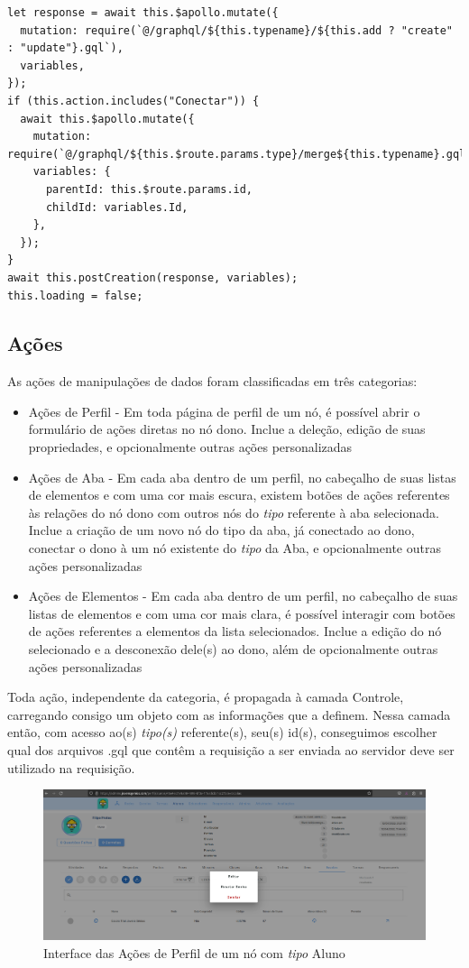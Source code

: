 \begin{lstlisting}
let response = await this.$apollo.mutate({
  mutation: require(`@/graphql/${this.typename}/${this.add ? "create" : "update"}.gql`),
  variables,
});
if (this.action.includes("Conectar")) {
  await this.$apollo.mutate({
    mutation: require(`@/graphql/${this.$route.params.type}/merge${this.typename}.gql`),
    variables: {
      parentId: this.$route.params.id,
      childId: variables.Id,
    },
  });
}
await this.postCreation(response, variables);
this.loading = false;
\end{lstlisting}

\subsection{Ações}

As ações de manipulações de dados foram classificadas em três categorias:
\begin{itemize}
    \item Ações de Perfil - Em toda página de perfil de um nó, é possível abrir o formulário de ações diretas no nó dono. Inclue a deleção, edição de suas propriedades, e opcionalmente outras ações personalizadas
    \item Ações de Aba - Em cada aba dentro de um perfil, no cabeçalho de suas listas de elementos e com uma cor mais escura, existem botões de ações referentes às relações do nó dono com outros nós do \textit{tipo} referente à aba selecionada. Inclue a criação de um novo nó do tipo da aba, já conectado ao dono, conectar o dono à um nó existente do \textit{tipo} da Aba, e opcionalmente outras ações personalizadas
    \item Ações de Elementos - Em cada aba dentro de um perfil, no cabeçalho de suas listas de elementos e com uma cor mais clara, é possível interagir com botões de ações referentes a elementos da lista selecionados. Inclue a edição do nó selecionado e a desconexão dele(s) ao dono, além de opcionalmente outras ações personalizadas
\end{itemize}
Toda ação, independente da categoria, é propagada à camada Controle, carregando consigo um objeto com as informações que a definem. Nessa camada então, com acesso ao(s) \textit{tipo(s)} referente(s), seu(s) id(s), conseguimos escolher qual dos arquivos .gql que contêm a requisição a ser enviada ao servidor deve ser utilizado na requisição.
\begin{figure}
    \centering
    \includegraphics[width=1\linewidth]{Imagens/chap04/front-profile-actions.png}
    \caption{Interface das Ações de Perfil de um nó com \textit{tipo} Aluno}
    \label{fig:front-profile-actions}
\end{figure}

